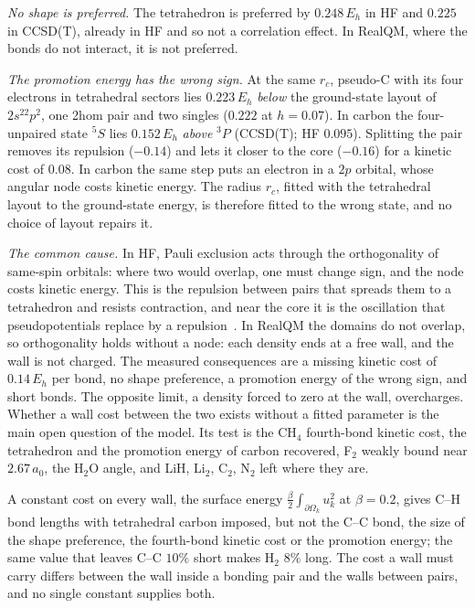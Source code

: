 \emph{No shape is preferred.} The tetrahedron is preferred by $0.248\,E_h$ in HF and $0.225$ in CCSD(T),
already in HF and so not a correlation effect. In RealQM, where the bonds do not interact, it is not
preferred.

\emph{The promotion energy has the wrong sign.} At the same $r_c$, pseudo-C with its four electrons in
tetrahedral sectors lies $0.223\,E_h$ \emph{below} the ground-state layout of $2s^22p^2$, one 2hom pair and
two singles ($0.222$ at $h = 0.07$). In carbon the four-unpaired state $^5S$ lies $0.152\,E_h$ \emph{above}
$^3P$ (CCSD(T); HF $0.095$). Splitting the pair removes its repulsion ($-0.14$) and lets it closer to the
core ($-0.16$) for a kinetic cost of $0.08$. In carbon the same step puts an electron in a $2p$ orbital,
whose angular node costs kinetic energy. The radius $r_c$, fitted with the tetrahedral layout to the
ground-state energy, is therefore fitted to the wrong state, and no choice of layout repairs it.

\emph{The common cause.} In HF, Pauli exclusion acts through the orthogonality of same-spin orbitals:
where two would overlap, one must change sign, and the node costs kinetic energy. This is the repulsion
between pairs that spreads them to a tetrahedron and resists contraction, and near the core it is the
oscillation that pseudopotentials replace by a repulsion~\cite{PhillipsKleinman59}. In RealQM the domains do not overlap,
so orthogonality holds without a node: each density ends at a free wall, and the wall is not charged. The
measured consequences are a missing kinetic cost of $0.14\,E_h$ per bond, no shape preference, a
promotion energy of the wrong sign, and short bonds. The opposite limit, a density forced to zero at the
wall, overcharges. Whether a wall cost between the two exists without a fitted parameter is the main open
question of the model. Its test is the CH$_4$ fourth-bond kinetic cost, the tetrahedron and the promotion
energy of carbon recovered, F$_2$ weakly bound near $2.67\,a_0$, the H$_2$O angle, and LiH, Li$_2$,
C$_2$, N$_2$ left where they are.

A constant cost on every wall, the surface energy $\tfrac{\beta}{2}\int_{\partial\Omega_k}u_k^2$ at
$\beta = 0.2$, gives C--H bond lengths with tetrahedral carbon imposed, but not the C--C bond, the size of the
shape preference, the fourth-bond kinetic cost or the promotion energy; the same value that leaves C--C $10\%$
short makes H$_2$ $8\%$ long. The cost a wall must carry differs between the wall inside a bonding pair and the
walls between pairs, and no single constant supplies both.

